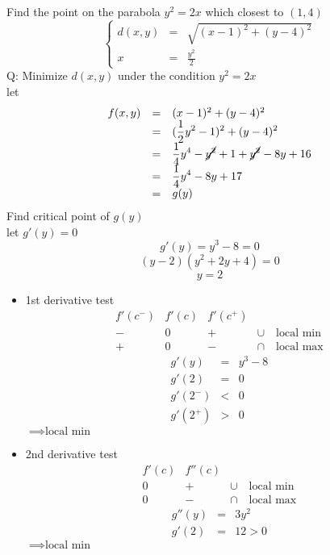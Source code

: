 \begin{eg}
Find the point on the parabola $y^2 = 2x$ which closest to $(1, 4)$
$$\left \{ \begin{array}{rcl}
d(x, y) & = & \sqrt{(x-1)^2 + (y-4)^2}\\
x & = & \displaystyle \frac{y^2}{2}
\end{array}\right.$$
Q: Minimize $d(x, y)$ under the condition $y^2= 2x$\\
let
$$\begin{array}{rcl}
f(x, y) & = & (x-1)^2 + (y-4)^2\\
& = & \displaystyle (\frac{1}{2}y^2 -1)^2 + (y-4)^2\\
& = & \displaystyle \frac{1}{4}y^4- \cancel{y^2} + 1 +\cancel{ y^2} - 8y + 16\\
& = & \displaystyle \frac{1}{4}y^4 - 8y+ 17\\
& = & g(y)
\end{array}$$
Find critical point of $g(y)$\\
let $g'(y) = 0$\\
$$g'(y) = y^3-8=0$$
$$(y-2)(y^2+2y+4)=0$$
$$y=2$$
\begin{itemize}
\item 1st derivative test\\
$$\begin{array}{cccc}
f'(c^-) & f'(c) & f'(c^+) & \\
- & 0 & + & \cup \quad \text{local min}\\
+ & 0 & - & \cap \quad \text{local max}
\end{array}$$
$$\begin{array}{rcl}
g'(y) & = & y^3 - 8\\
g'(2) & = & 0\\
g'(2^-) & < & 0\\ 
g'(2^+) & > & 0
\end{array}$$
$\implies \text{local min}$
\item 2nd derivative test\\
$$\begin{array}{ccc}
f'(c) & f''(c) & \\
0 & + & \cup \quad \text{local min}\\
0 & -& \cap \quad \text{local max}
\end{array}$$
$$\begin{array}{rcl}
g''(y) & = & 3y^2\\
g'(2) & = & 12>0
\end{array}$$
$\implies \text{local min}$
\end{itemize}
\end{eg}
